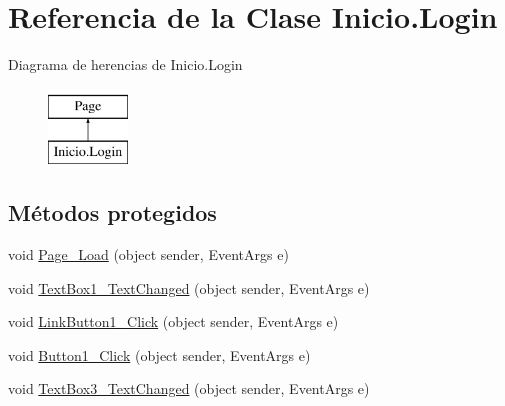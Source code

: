 \hypertarget{classInicio_1_1Login}{}\section{Referencia de la Clase Inicio.\+Login}
\label{classInicio_1_1Login}
Diagrama de herencias de Inicio.\+Login\begin{figure}[H]
\begin{center}
\leavevmode
\includegraphics[height=2.000000cm]{classInicio_1_1Login}
\end{center}
\end{figure}
\subsection*{Métodos protegidos}
\begin{DoxyCompactItemize}
\item 
void \mbox{\hyperlink{classInicio_1_1Login_a82c40c536f8833e113c9149c09b1f4de}{Page\+\_\+\+Load}} (object sender, Event\+Args e)
\item 
void \mbox{\hyperlink{classInicio_1_1Login_ac97e06c22c6f6ac020c4cf2eff5e48ea}{Text\+Box1\+\_\+\+Text\+Changed}} (object sender, Event\+Args e)
\item 
void \mbox{\hyperlink{classInicio_1_1Login_a4d29cabcb378199a88f9ec9dc57961da}{Link\+Button1\+\_\+\+Click}} (object sender, Event\+Args e)
\item 
void \mbox{\hyperlink{classInicio_1_1Login_a4c72ae6605baac8dff22e547df892ba1}{Button1\+\_\+\+Click}} (object sender, Event\+Args e)
\item 
void \mbox{\hyperlink{classInicio_1_1Login_a332bc2333d4b1baf24c09b02f343734b}{Text\+Box3\+\_\+\+Text\+Changed}} (object sender, Event\+Args e)
\end{DoxyCompactItemize}
